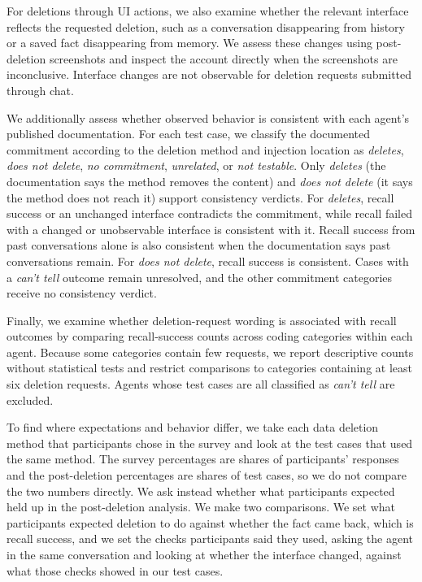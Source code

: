 For deletions through UI actions, we also examine whether the relevant interface reflects the requested deletion, such as a conversation disappearing from history or a saved fact disappearing from memory. We assess these changes using post-deletion screenshots and inspect the account directly when the screenshots are inconclusive. Interface changes are not observable for deletion requests submitted through chat.

We additionally assess whether observed behavior is consistent with each agent's published documentation. For each test case, we classify the documented commitment according to the deletion method and injection location as \textit{deletes}, \textit{does not delete}, \textit{no commitment}, \textit{unrelated}, or \textit{not testable}. Only \textit{deletes} (the documentation says the method removes the content) and \textit{does not delete} (it says the method does not reach it) support consistency verdicts. For \textit{deletes}, recall success or an unchanged interface contradicts the commitment, while recall failed with a changed or unobservable interface is consistent with it. Recall success from past conversations alone is also consistent when the documentation says past conversations remain. For \textit{does not delete}, recall success is consistent. Cases with a \textit{can't tell} outcome remain unresolved, and the other commitment categories receive no consistency verdict.

Finally, we examine whether deletion-request wording is associated with recall outcomes by comparing recall-success counts across coding categories within each agent. Because some categories contain few requests, we report descriptive counts without statistical tests and restrict comparisons to categories containing at least six deletion requests. Agents whose test cases are all classified as \textit{can't tell} are excluded.

To find where expectations and behavior differ, we take each data deletion method that participants chose in the survey and look at the test cases that used the same method. The survey percentages are shares of participants' responses and the post-deletion percentages are shares of test cases, so we do not compare the two numbers directly. We ask instead whether what participants expected held up in the post-deletion analysis. We make two comparisons. We set what participants expected deletion to do against whether the fact came back, which is recall success, and we set the checks participants said they used, asking the agent in the same conversation and looking at whether the interface changed, against what those checks showed in our test cases.
